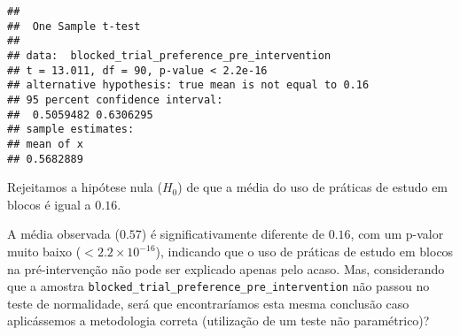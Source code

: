 \documentclass[
]{article}
\begin{document}
\begin{verbatim}
## 
##  One Sample t-test
## 
## data:  blocked_trial_preference_pre_intervention
## t = 13.011, df = 90, p-value < 2.2e-16
## alternative hypothesis: true mean is not equal to 0.16
## 95 percent confidence interval:
##  0.5059482 0.6306295
## sample estimates:
## mean of x 
## 0.5682889
\end{verbatim}

Rejeitamos a hipótese nula (\(H_0\)) de que a média do uso de práticas
de estudo em blocos é igual a \(0.16\).

A média observada (\(0.57\)) é significativamente diferente de \(0.16\),
com um p-valor muito baixo (\(< 2.2 \times 10^{-16}\)), indicando que o
uso de práticas de estudo em blocos na pré-intervenção não pode ser
explicado apenas pelo acaso. Mas, considerando que a amostra
\texttt{blocked\_trial\_preference\_pre\_intervention} não passou no
teste de normalidade, será que encontraríamos esta mesma conclusão caso
aplicássemos a metodologia correta (utilização de um teste não
paramétrico)?
\end{document}

